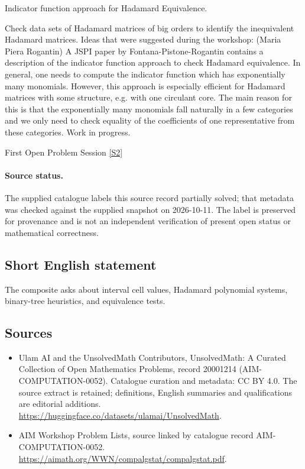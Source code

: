 \documentclass[11pt]{article}
\newcommand{\sref}[2]{\hyperlink{source:#1:#2}{[S#2]}}
\begin{document}
Indicator function approach for Hadamard Equivalence.

Check data sets of Hadamard matrices of big orders to identify the inequivalent Hadamard matrices. Ideas that were suggested during the workshop: (Maria Piera Rogantin) A JSPI paper by Fontana-Pistone-Rogantin contains a description of the indicator function approach to check Hadamard equivalence. In general, one needs to compute the indicator function which has exponentially many monomials. However, this approach is especially efficient for Hadamard matrices with some structure, e.g. with one circulant core. The main reason for this is that the exponentially many monomials fall naturally in a few categories and we only need to check equality of the coefficients of one representative from these categories. Work in progress.

First Open Problem Session \sref{20001214}{2}
\paragraph{Source status.}
The supplied catalogue labels this source record partially solved; that metadata was checked against the supplied snapshot on 2026-10-11. The label is preserved for provenance and is not an independent verification of present open status or mathematical correctness.
\subsection{Short English statement}
The composite asks about interval cell values, Hadamard polynomial systems, binary-tree heuristics, and equivalence tests.
\subsection{Sources}
\begin{itemize}
\item[\hypertarget{source:20001214:1}{S1}] Ulam AI and the UnsolvedMath Contributors, UnsolvedMath: A Curated Collection of Open Mathematics Problems, record 20001214 (AIM-COMPUTATION-0052). Catalogue curation and metadata: CC BY 4.0. The source extract is retained; definitions, English summaries and qualifications are editorial additions.
\url{https://huggingface.co/datasets/ulamai/UnsolvedMath}.
\item[\hypertarget{source:20001214:2}{S2}] AIM Workshop Problem Lists, source linked by catalogue record AIM-COMPUTATION-0052.
\url{https://aimath.org/WWN/compalgstat/compalgstat.pdf}.
\end{itemize}
\end{document}
